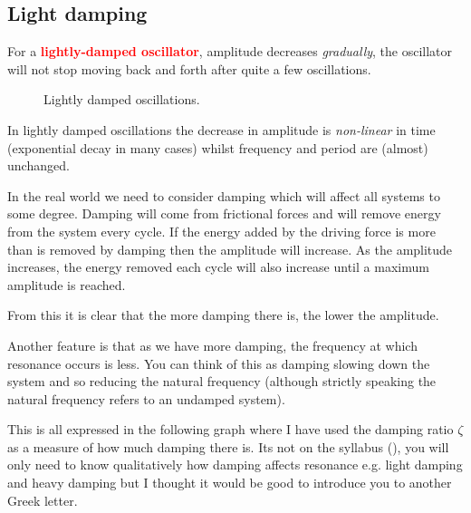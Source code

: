 \documentclass[a4paper,12pt]{book}
\newcommand{\piste}{{\fontencoding{U}\fontfamily{futs}\selectfont\char 49\relax}}
\newcommand{\keypoint}[1]{\textbf{\textcolor{red}{#1}}}
\newcommand{\piste}{\textsuperscript{$\star$}}
\newcommand{\keypoint}[1]{\textbf{\textcolor{red}{#1}}}
\begin{document}
\subsection{Light damping}

For a \keypoint{lightly-damped oscillator}, amplitude decreases \emph{gradually}, the oscillator will not stop moving back and forth after quite a few oscillations.

\begin{figure}[ht]
\centering
{}
\caption{Lightly damped oscillations.}
\end{figure}

In lightly damped oscillations the decrease in amplitude is \emph{non-linear} in time (exponential decay in many cases) whilst frequency and period are (almost) unchanged.

	In the real world we need to consider damping which will affect all systems to some degree. Damping will come from frictional forces and will remove energy from the system every cycle. If the energy added by the driving force is more than is removed by damping then the amplitude will increase. As the amplitude increases, the energy removed each cycle will also increase until a maximum amplitude is reached.
	
	From this it is clear that the more damping there is, the lower the amplitude. 
	
	Another feature is that as we have more damping, the frequency at which resonance occurs is less. You can think of this as damping slowing down the system and so reducing the natural frequency (although strictly speaking the natural frequency refers to an undamped system).
	
	
	This is all expressed in the following graph where I have used the damping ratio $\zeta$ as a measure of how much damping there is. Its not on the syllabus (\piste), you will only need to know qualitatively how damping affects resonance e.g. light damping and heavy damping but I thought it would be good to introduce you to another Greek letter.
	
\end{document}
